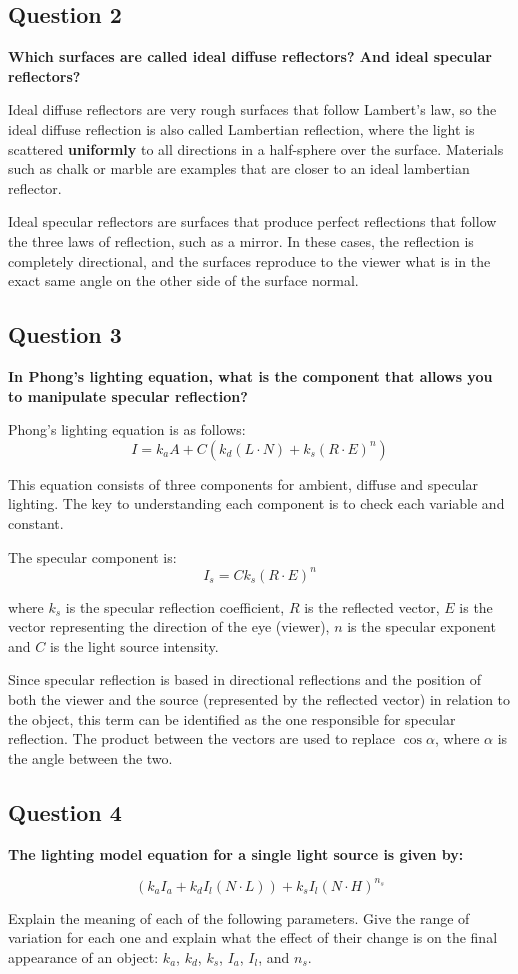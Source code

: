 \documentclass[12pt]{article}
\begin{document}
\subsection*{Question 2}
{\bfseries Which surfaces are called ideal diffuse reflectors? And ideal specular reflectors?}

Ideal diffuse reflectors are very rough surfaces that follow Lambert's law, so the ideal diffuse reflection is also called Lambertian reflection, where the light is scattered \textbf{uniformly} to all directions in a half-sphere over the surface. Materials such as chalk or marble are examples that are closer to an ideal lambertian reflector.

Ideal specular reflectors are surfaces that produce perfect reflections that follow the three laws of reflection, such as a mirror. In these cases, the reflection is completely directional, and the surfaces reproduce to the viewer what is in the exact same angle on the other side of the surface normal.

\subsection*{Question 3}
{\bfseries In Phong’s lighting equation, what is the component that allows you to manipulate specular reflection?}

Phong's lighting equation is as follows:
\[ I=k_aA+C(k_d(L\cdot N)+k_s(R\cdot E)^n) \]

This equation consists of three components for ambient, diffuse and specular lighting. The key to understanding each component is to check each variable and constant.

The specular component is:
\[ I_s=Ck_s(R\cdot E)^n \]

where $k_s$ is the specular reflection coefficient, $R$ is the reflected vector, $E$ is the vector representing the direction of the eye (viewer), $n$ is the specular exponent and $C$ is the light source intensity.

Since specular reflection is based in directional reflections and the position of both the viewer and the source (represented by the reflected vector) in relation to the object, this term can be identified as the one responsible for specular reflection. The product between the vectors are used to replace $\cos{\alpha}$, where $\alpha$ is the angle between the two.

\subsection*{Question 4}
{\bfseries The lighting model equation for a single light source is given by:

\[(k_aI_a + k_dI_l(N \cdot L)) + k_sI_l(N \cdot H)^{n_s}\]

Explain the meaning of each of the following parameters. Give the range of variation for each one
and explain what the effect of their change is on the final appearance of an object: $k_a$, $k_d$, $k_s$, $I_a$, $I_l$, and $n_s$.}
\end{document}
